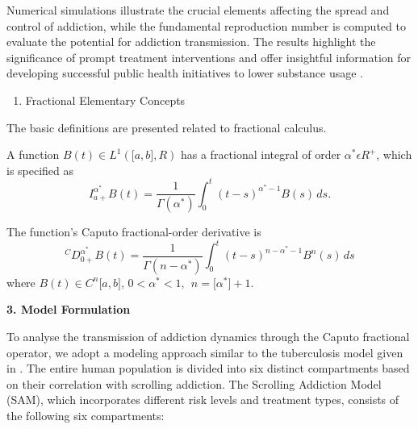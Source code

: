 \documentclass[10pt]{NSP1}
\begin{document}
	Numerical simulations illustrate the crucial elements affecting the spread and control of addiction, while the fundamental reproduction number is computed to evaluate the potential for addiction transmission. The results highlight the significance of prompt treatment interventions and offer insightful information for developing successful public health initiatives to lower substance usage \cite{ref15, ref16, ref17, ref18, ref19, ref20}.
	
	\begin{enumerate}
		\item Fractional Elementary Concepts
	\end{enumerate}
	
	The basic definitions are presented related to fractional calculus.
	
	\par\medskip{}\smallskip
	
	A function \(B(t) \in L^{1}(\lbrack a,b\rbrack,R)\) has a fractional integral of order \(\alpha^{*}\epsilon R^{+}\), which is specified as
	\[
	I_{a +}^{\alpha^{*}}B(t) = \frac{1}{\Gamma(\alpha^{*})}\int_{0}^{t}{(t - s)}^{\alpha^{*} - 1}B(s)\,ds. \tag{2.1}
	\]
	
	\par\medskip{}\smallskip
	
	The function's Caputo fractional-order derivative is
	\[
	{}^{C}D_{0 +}^{\alpha^{*}}B(t) = \frac{1}{\Gamma(n - \alpha^{*})}\int_{0}^{t}(t - s)^{n - \alpha^{*} - 1}B^{n}(s)\,ds \tag{2.2}
	\]
	where \(B(t) \in C^{n}\lbrack a,b\rbrack\), \(0 < \alpha^{*} < 1,\ \ n = \lbrack\alpha^{*}\rbrack + 1\).
	
\par\medskip\noindent \begin{center}\large\bfseries 3. Model Formulation\end{center}\smallskip

To analyse the transmission of addiction dynamics through the Caputo fractional operator, we adopt a modeling approach similar to the tuberculosis model given in \cite{ref10}. The entire human population is divided into six distinct compartments based on their correlation with scrolling addiction. The Scrolling Addiction Model (SAM), which incorporates different risk levels and treatment types, consists of the following six compartments:
\end{document}
